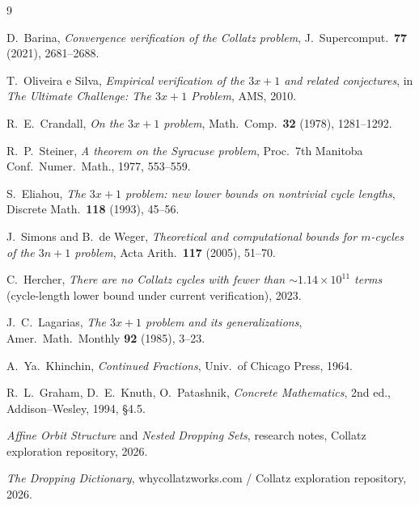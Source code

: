 \documentclass[11pt]{article}
\theoremstyle{definition}
\begin{document}
\begin{thebibliography}{9}

 D.\ Barina, \emph{Convergence verification of the Collatz
problem}, J.\ Supercomput.\ \textbf{77} (2021), 2681--2688.

 T.\ Oliveira e Silva, \emph{Empirical verification of the
$3x+1$ and related conjectures}, in \emph{The Ultimate Challenge: The $3x+1$
Problem}, AMS, 2010.

 R.\ E.\ Crandall, \emph{On the $3x+1$ problem}, Math.\ Comp.\
\textbf{32} (1978), 1281--1292.

 R.\ P.\ Steiner, \emph{A theorem on the Syracuse problem},
Proc.\ 7th Manitoba Conf.\ Numer.\ Math., 1977, 553--559.

 S.\ Eliahou, \emph{The $3x+1$ problem: new lower bounds on
nontrivial cycle lengths}, Discrete Math.\ \textbf{118} (1993), 45--56.

 J.\ Simons and B.\ de Weger, \emph{Theoretical and
computational bounds for $m$-cycles of the $3n+1$ problem}, Acta Arith.\
\textbf{117} (2005), 51--70.

 C.\ Hercher, \emph{There are no Collatz cycles with fewer than
$\sim 1.14\times 10^{11}$ terms} (cycle-length lower bound under current
verification), 2023.

 J.\ C.\ Lagarias, \emph{The $3x+1$ problem and its
generalizations}, Amer.\ Math.\ Monthly \textbf{92} (1985), 3--23.

\bibitem{khinchin} A.\ Ya.\ Khinchin, \emph{Continued Fractions}, Univ.\ of
Chicago Press, 1964.

 R.\ L.\ Graham, D.\ E.\ Knuth, O.\ Patashnik,
\emph{Concrete Mathematics}, 2nd ed., Addison--Wesley, 1994, \S4.5.

\bibitem{affine} \emph{Affine Orbit Structure} and \emph{Nested Dropping Sets},
research notes, Collatz exploration repository, 2026.

 \emph{The Dropping Dictionary}, whycollatzworks.com /
Collatz exploration repository, 2026.

\end{thebibliography}
\end{document}
